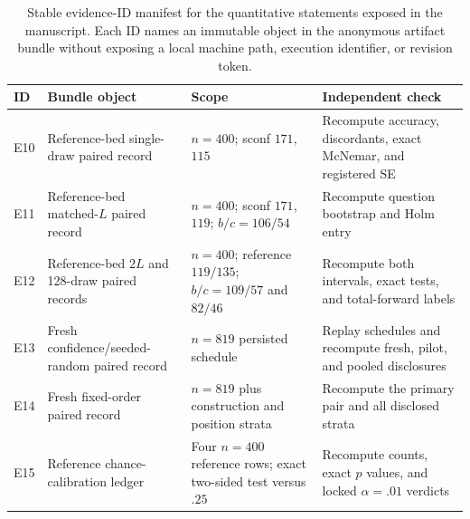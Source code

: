\begin{table}[H]
\centering
\footnotesize
\setlength{\tabcolsep}{3pt}
\caption{Stable evidence-ID manifest for the quantitative statements exposed
in the manuscript.  Each ID names an immutable object in the anonymous
artifact bundle without exposing a local machine path, execution identifier,
or revision token.}
\label{tab:evidence-manifest}
\begin{tabularx}{\textwidth}{@{}lP{0.25\textwidth}YY@{}}
\toprule
ID & Bundle object & Scope & Independent check \\
\midrule
E10 & Reference-bed single-draw paired record & $n=400$; sconf{} $171$,
\mcu{} $115$ & Recompute accuracy, discordants, exact McNemar, and registered SE \\
E11 & Reference-bed matched-$L$ paired record & $n=400$; sconf{} $171$,
\mcu{} $119$; $b/c=106/54$ & Recompute question bootstrap and Holm entry \\
E12 & Reference-bed $2L$ and 128-draw paired records & $n=400$; reference
$119/135$; $b/c=109/57$ and $82/46$ & Recompute both intervals, exact tests,
and total-forward labels \\
E13 & Fresh confidence/seeded-random paired record & $n=819$ persisted
schedule & Replay schedules and recompute fresh, pilot, and pooled disclosures \\
E14 & Fresh fixed-order paired record & $n=819$ plus construction and position
strata & Recompute the primary pair and all disclosed strata \\
E15 & Reference chance-calibration ledger & Four $n=400$ reference rows;
exact two-sided test versus $.25$ & Recompute counts, exact $p$ values, and
locked $\alpha=.01$ verdicts \\
\bottomrule
\end{tabularx}
\end{table}

